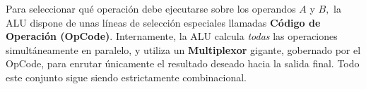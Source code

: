 Para seleccionar qué operación debe ejecutarse sobre los operandos $A$ y $B,$ la ALU dispone de unas líneas de selección especiales llamadas \textbf{Código de Operación (OpCode)}. Internamente, la ALU calcula \textit{todas} las operaciones simultáneamente en paralelo, y utiliza un \textbf{Multiplexor} gigante, gobernado por el OpCode, para enrutar únicamente el resultado deseado hacia la salida final. Todo este conjunto sigue siendo estrictamente combinacional.
